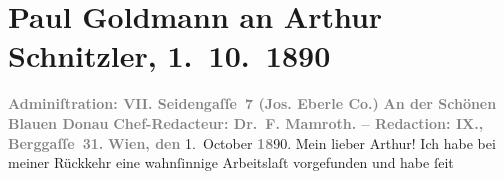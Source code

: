 

         
         \renewcommand{\erwaehntePersonen}{Personen: Marie Glümer, Paul Goldmann, Jeanette Heeger, Fedor Mamroth, Hilda von Mitis}
         \renewcommand{\erwaehnteInstitutionen}{Institutionen: An der schönen blauen Donau, Josef Eberle Stein-, Buch und Musikaliendruckerei, Konservatorium der Gesellschaft der Musikfreunde}
         \renewcommand{\erwaehnteOrte}{Orte: Berggasse, Salzburg, Seidengasse, Wien}
         \renewcommand{\erwaehnteWerke}{Werke: An der schönen blauen Donau, Der Feiertag des Herzens. Ein Abriß, Faust. Eine Tragödie}
               \section[Paul Goldmann an Arthur Schnitzler, 1. 10. 1890]{ Paul Goldmann an Arthur Schnitzler, 1. 10. 1890}\nopagebreak{}\rehead{ }\begin{ledgroupsized}[t]{13cm}\normalsize\beginnumbering \toendnotes[C]{\smallbreak\pagebreak[2]} 
\toendnotes[C]{\smallbreak}\pstart
           \noindent{}\centering{}{\pb}\textcolor{gray}{\textbf{\textbf{Adminiſtration: VII.
                           Seidengaſſe 7} (Jos. Eberle {\kaufmannsund} Co.)}}\pend
           \pstart
           \noindent{}\centering{}\textcolor{gray}{\textbf{An der Schönen Blauen Donau}}\pend
           \pstart
           \noindent{}\centering{}\textcolor{gray}{\textbf{Chef-Redacteur: Dr. F.
                        Mamroth. – Redaction: IX.,
                        Berggaſſe 31.}}\pend
           \pstart
           \raggedleft{}\textcolor{gray}{\textbf{Wien, den}}{ }1. October \textcolor{gray}{\textbf{18}}90.\pend
           \pstart\center{}Mein lieber Arthur!\pend\pstart
           Ich habe bei meiner Rückkehr eine wahnſinnige Arbeitslaſt vorgefunden und habe ſeit

\end{ledgroupsized}

